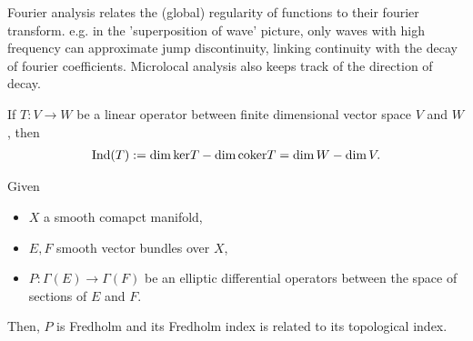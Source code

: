 \documentclass{beamer}
\begin{document}
Fourier analysis relates the (global) regularity of functions to their fourier transform. e.g. in the 'superposition of wave' picture, only waves with high frequency can approximate jump discontinuity, linking continuity with the decay of fourier coefficients. 
Microlocal analysis also keeps track of the direction of decay. 
\begin{theorem}
    If $T : V \to W$ be a linear operator between finite dimensional vector space $V$ and $W$, then 
    \begin{align*}
    \mathrm{Ind}(T) := \dim {\mathrm{ker}} T - \dim {\mathrm{coker}} T = \dim W - \dim V. 
    \end{align*}
\end{theorem}
\begin{theorem}
    Given
    \begin{itemize}
        \item $X$ a smooth comapct manifold, 
        \item $E, F$ smooth vector bundles over $X$, 
        \item $P : \Gamma(E) \to \Gamma(F)$ be an elliptic differential operators between the space of sections of $E$ and $F$. 
    \end{itemize}
    Then, $P$ is Fredholm and its Fredholm index is related to its topological index. 
\end{theorem}
\end{document}
